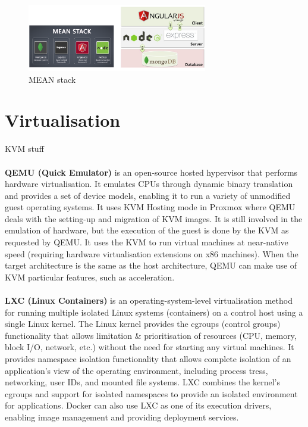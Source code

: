\documentclass[a4paper,11pt]{article}
\begin{document}
\begin{figure}[H]
    \centering
    \includegraphics[width=0.7\textwidth]{./images/mean.png}
    \caption{ MEAN stack }
\end{figure}

\section{Virtualisation}
KVM stuff
\\\\
\textbf{QEMU (Quick Emulator)} is an open-source hosted hypervisor that performs hardware virtualisation.
It emulates CPUs through dynamic binary translation and provides a set of device models, enabling it to run a variety of unmodified guest operating systems.
It uses KVM Hosting mode in Proxmox where QEMU deals with the setting-up and migration of KVM images.
It is still involved in the emulation of hardware, but the execution of the guest is done by the KVM as requested by QEMU.
It uses the KVM to run virtual machines at near-native speed (requiring hardware virtualisation extensions on x86 machines).
When the target architecture is the same as the host architecture, QEMU can make use of KVM particular features, such as acceleration.
\\\\
\textbf{LXC (Linux Containers)} is an operating-system-level virtualisation method for running multiple isolated Linux systems (containers) on a control host using a single Linux kernel.
The Linux kernel provides the cgroups (control groups) functionality that allows limitation \& prioritisation of resources (CPU, memory, block I/O, network, etc.) without the need for starting any virtual machines.
It provides namespace isolation functionality that allows complete isolation of an application's view of the operating environment, including process tress, networking, user IDs, and mounted file systems.
LXC combines the kernel's cgroups and support for isolated namespaces to provide an isolated environment for applications.
Docker can also use LXC as one of its execution drivers, enabling image management and providing deployment services.
\\\\
\end{document}
